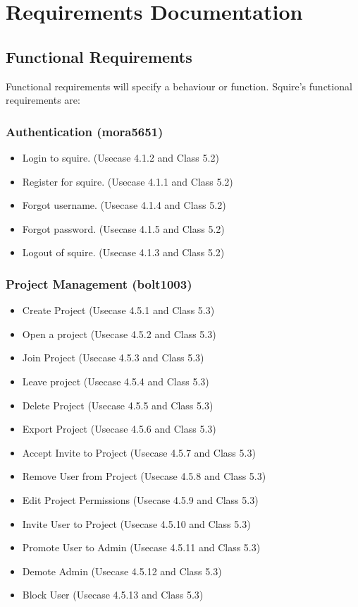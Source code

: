 \documentclass[11pt]{report}
\begin{document}
\chapter{Requirements Documentation}
\section{Functional Requirements}
    Functional requirements will specify a behaviour or function. Squire's functional requirements are:
    \subsection{Authentication (mora5651)}
        \begin{itemize}
            \item Login to squire. (Usecase 4.1.2 and Class 5.2)
            \item Register for squire. (Usecase 4.1.1 and Class 5.2)
            \item Forgot username. (Usecase 4.1.4 and Class 5.2)
            \item Forgot password. (Usecase 4.1.5 and Class 5.2)
            \item Logout of squire. (Usecase 4.1.3 and Class 5.2)
        \end{itemize}
    \subsection{Project Management (bolt1003)}
        \begin{itemize}
            \item Create Project (Usecase 4.5.1 and Class 5.3)
            \item Open a project (Usecase 4.5.2 and Class 5.3)
            \item Join Project (Usecase 4.5.3 and Class 5.3)
            \item Leave project (Usecase 4.5.4 and Class 5.3)
            \item Delete Project (Usecase 4.5.5 and Class 5.3)
            \item Export Project (Usecase 4.5.6 and Class 5.3)
            \item Accept Invite to Project (Usecase 4.5.7 and Class 5.3)
            \item Remove User from Project (Usecase 4.5.8 and Class 5.3)
            \item Edit Project Permissions (Usecase 4.5.9 and Class 5.3)
            \item Invite User to Project (Usecase 4.5.10 and Class 5.3)
            \item Promote User to Admin (Usecase 4.5.11 and Class 5.3)
            \item Demote Admin (Usecase 4.5.12 and Class 5.3)
            \item Block User (Usecase 4.5.13 and Class 5.3)
        \end{itemize}
\end{document}
